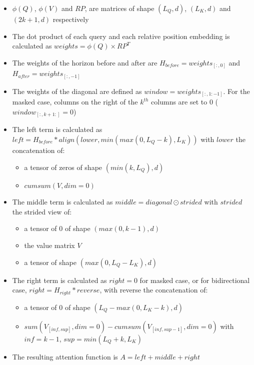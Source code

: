 \begin{itemize}
\tightlist
\item
  \(\phi(Q)\), \(\phi(V)\) and \(RP\), are matrices of shape
  \((L_Q, d)\), \((L_K, d)\) and \((2k+1, d)\) respectively
\item
  The dot product of each query and each relative position embedding is
  calculated as \(weights = \phi(Q) \times RP^T\)
\item
  The weights of the horizon before and after are
  \(H_{before} = weights_{[:, 0]}\) and
  \(H_{after} = weights_{[:, -1]}\)
\item
  The weights of the diagonal are defined as
  \(window = weights_{[:,1:-1]}\). For the masked case, columns on the
  right of the \(k^{th}\) columns are set to 0
  (\(window_{[:, k+1:]} = 0\))
\item
  The left term is calculated as
  \(left = H_{before} * align(lower, min(max(0, L_Q-k), L_K))\) with
  \(lower\) the concatenation of:

  \begin{itemize}
  \tightlist
  \item
    a tensor of zeros of shape \(\left(min(k, L_Q), d\right)\)
  \item
    \(cumsum(V, dim=0)\)
  \end{itemize}
\item
  The middle term is calculated as \(middle = diagonal \odot strided\)
  with \(strided\) the strided view of:

  \begin{itemize}
  \tightlist
  \item
    a tensor of 0 of shape \((max(0, k-1), d)\)
  \item
    the value matrix \(V\)
  \item
    a tensor of shape \((max(0, L_Q-L_K), d)\)
  \end{itemize}
\item
  The right term is calculated as \(right = 0\) for masked case, or for
  bidirectional case, \(right = H_{right} * reverse\), with reverse the
  concatenation of:

  \begin{itemize}
  \tightlist
  \item
    a tensor of 0 of shape \((L_Q-max(0, L_K-k), d)\)
  \item
    \(sum(V_{[inf, sup]}, dim=0) - cumsum(V_{[inf, sup-1]}, dim=0)\)
    with \(inf = k-1\), \(sup = min(L_Q+k, L_K)\)
  \end{itemize}
\item
  The resulting attention function is \(A = left + middle + right\)
\end{itemize}

